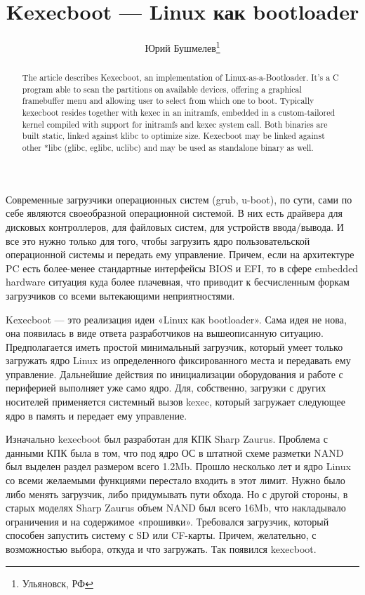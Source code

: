 \documentclass[10pt, a5paper]{article}
\begin{document}
\title{Kexecboot --- Linux как bootloader}%

\author{Юрий Бушмелев\footnote{Ульяновск, РФ}}
\maketitle

\begin{abstract}
The article describes Kexecboot, an implementation of Linux-as-a-Bootloader. It's a C program able to scan the partitions on available devices, offering a graphical framebuffer menu and allowing user to select from which one to boot.
Typically kexecboot resides together with kexec in an initramfs, embedded in a custom-tailored kernel compiled with support for initramfs and kexec system call. Both binaries are built static, linked against klibc to optimize size. Kexecboot may be linked against other *libc (glibc, eglibc, uclibc) and may be used as standalone binary as well.
\end{abstract}

Современные загрузчики операционных систем (grub, u-boot), по сути, сами по себе являются своеобразной операционной системой. В них есть драйвера для дисковых контроллеров, для файловых систем, для устройств ввода/вывода. И все это нужно только для того, чтобы загрузить ядро пользовательской операционной системы и передать ему управление. Причем, если на архитектуре PC есть более-менее стандартные интерфейсы BIOS и EFI, то в сфере embedded hardware ситуация куда более плачевная, что приводит к бесчисленным форкам загрузчиков со всеми вытекающими неприятностями.

Kexecboot --- это реализация идеи «Linux как bootloader». Сама идея не нова, она появилась в виде ответа разработчиков на вышеописанную ситуацию. Предполагается иметь простой минимальный загрузчик, который умеет только загружать ядро Linux из определенного фиксированного места и передавать ему управление. Дальнейшие действия по инициализации оборудования и работе с периферией выполняет уже само ядро. Для, собственно, загрузки с других носителей применяется системный вызов kexec, который загружает следующее ядро в память и передает ему управление.

Изначально kexecboot был разработан для КПК Sharp Zaurus. Проблема с данными КПК была в том, что под ядро ОС в штатной схеме разметки NAND был выделен раздел размером всего 1.2Mb. Прошло несколько лет и ядро Linux со всеми желаемыми функциями перестало входить в этот лимит. Нужно было либо менять загрузчик, либо придумывать пути обхода. Но с другой стороны, в старых моделях Sharp Zaurus объем NAND был всего 16Mb, что накладывало ограничения и на содержимое «прошивки». Требовался загрузчик, который способен запустить систему с SD или CF-карты. Причем, желательно, с возможностью выбора, откуда и что загружать. Так появился kexecboot.
\end{document}

